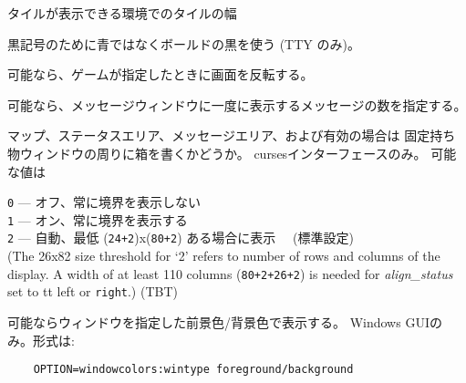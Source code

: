 タイルが表示できる環境でのタイルの幅
\item[\ib{use\verb+_+darkgray}]
黒記号のために青ではなくボールドの黒を使う (TTY のみ)。
\item[\ib{use\verb+_+inverse}]
可能なら、ゲームが指定したときに画面を反転する。
\item[\ib{vary\verb+_+msgcount}]
可能なら、メッセージウィンドウに一度に表示するメッセージの数を指定する。
\item[\ib{windowborders}]
マップ、ステータスエリア、メッセージエリア、および有効の場合は
固定持ち物ウィンドウの周りに箱を書くかどうか。
cursesインターフェースのみ。
可能な値は

{\tt 0} --- オフ、常に境界を表示しない\\
{\tt 1} --- オン、常に境界を表示する\\
{\tt 2} --- 自動、最低
(\verb&24+2&)x(\verb&80+2&) ある場合に表示 \ \ (標準設定)\\

(The 26x82 size threshold for `2' refers to number of rows and
columns of the display.
A width of at least 110 columns (\verb&80+2+26+2&) is needed for
{\it align_status\/}
set to {tt left} or {\tt right}.)
(TBT)
\item[\ib{windowcolors}]
可能ならウィンドウを指定した前景色/背景色で表示する。
Windows GUIのみ。形式は:
\begin{verbatim}
    OPTION=windowcolors:wintype foreground/background
\end{verbatim}

